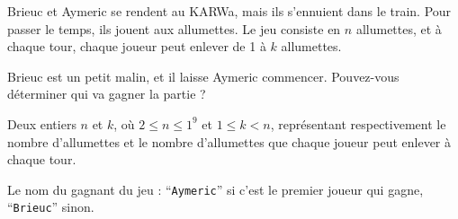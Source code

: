 \problemname{\problemyamlname}

Brieuc et Aymeric se rendent au KARWa, mais ils s'ennuient dans le train. Pour passer le temps, ils jouent aux allumettes. Le jeu consiste en $n$ allumettes,
et à chaque tour, chaque joueur peut enlever de 1 à $k$ allumettes.

Brieuc est un petit malin, et il laisse Aymeric commencer. Pouvez-vous déterminer qui va gagner la partie ?

\begin{Input}
	Deux entiers $n$ et $k$, où $2 \le n \le 1^9$ et $1 \le k < n$, représentant respectivement le nombre d'allumettes et le nombre d'allumettes que chaque joueur peut enlever à chaque tour.
\end{Input}

\begin{Output}
	Le nom du gagnant du jeu : ``\verb|Aymeric|'' si c'est le premier joueur qui gagne, ``\verb|Brieuc|'' sinon.
\end{Output}
